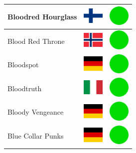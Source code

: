\documentclass[12pt, a4paper, twoside]{report}
\begin{document}
\begin{center}
\begin{longtable}{|p{5cm}|p{2cm}|p{2cm}|}
 Bloodred Hourglass                                         & \includegraphics[width=1cm]{../img/flags/fi} &   \includegraphics[width=1cm]{../likes/y} \\ \hline
 Blood Red Throne                                           & \includegraphics[width=1cm]{../img/flags/no} &   \includegraphics[width=1cm]{../likes/y} \\ \hline
 Bloodspot                                                  & \includegraphics[width=1cm]{../img/flags/de} &   \includegraphics[width=1cm]{../likes/y} \\ \hline
 Bloodtruth                                                 & \includegraphics[width=1cm]{../img/flags/it} &   \includegraphics[width=1cm]{../likes/y} \\ \hline
 Bloody Vengeance                                           & \includegraphics[width=1cm]{../img/flags/de} &   \includegraphics[width=1cm]{../likes/y} \\ \hline
 Blue Collar Punks                                          & \includegraphics[width=1cm]{../img/flags/de} &   \includegraphics[width=1cm]{../likes/y} \\ \hline

\end{longtable}
\end{center}
\end{document}
